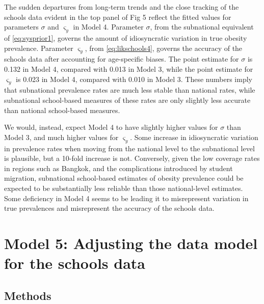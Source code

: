 \documentclass[10pt,letterpaper]{article}
\begin{document}
The sudden departures from long-term trends and the close tracking of
the schools data evident in the top panel of Fig 5 reflect the fitted
values for parameters \(\sigma\) and \(\varsigma_y\) in Model 4.
Parameter \(\sigma\), from the subnational equivalent of
\eqref{eq:sysprior1}, governs the amount of idiosyncratic variation in
true obesity prevalence. Parameter \(\varsigma_y\), from
\eqref{eq:likschools4}, governs the accuracy of the schools data after
accounting for age-specific biases. The point estimate for \(\sigma\) is
0.132 in Model 4, compared with 0.013 in Model 3, while the point
estimate for \(\varsigma_y\) is 0.023 in Model 4, compared with 0.010 in
Model 3. These numbers imply that subnational prevalence rates are much
less stable than national rates, while subnational school-based measures
of these rates are only slightly less accurate than national
school-based measures.

We would, instead, expect Model 4 to have slightly higher values for
\(\sigma\) than Model 3, and much higher values for \(\varsigma_y\).
Some increase in idiosyncratic variation in prevalence rates when moving
from the national level to the subnational level is plausible, but a
10-fold increase is not. Conversely, given the low coverage rates in
regions such as Bangkok, and the complications introduced by student
migration, subnational school-based estimates of obesity prevalence
could be expected to be substantially less reliable than those
national-level estimates. Some deficiency in Model 4 seems to be leading
it to misrepresent variation in true prevalences and misrepresent the
accuracy of the schools data.

\hypertarget{sec:model5}{%
\section{Model 5: Adjusting the data model for the schools
data}\label{sec:model5}}

\hypertarget{methods-4}{%
\subsection{Methods}\label{methods-4}}
\end{document}
